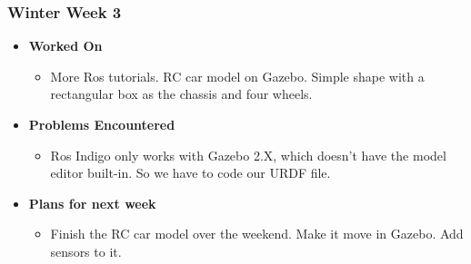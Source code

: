 \documentclass[compsoc,draftclsnofoot,onecolumn,10pt]{IEEEtran}
\begin{document}
\subsubsection{Winter Week 3}
\begin{itemize}
    \item {\textbf{Worked On}}
    \begin{itemize}
      \item More Ros tutorials. RC car model on Gazebo. Simple shape with a
      rectangular box as the chassis and four wheels.
    \end{itemize}

    \item {\textbf{Problems Encountered}}
    \begin{itemize}
      \item Ros Indigo only works with Gazebo 2.X, which doesn't have the
      model editor built-in. So we have to code our URDF file.
    \end{itemize}

    \item{\textbf{Plans for next week}}
    \begin{itemize}
      \item Finish the RC car model over the weekend. Make it move in
      Gazebo. Add sensors to it.
    \end{itemize}

\end{itemize}
\end{document}

